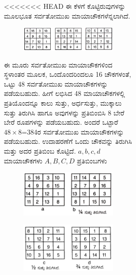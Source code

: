 \begin{figure}[H]
\begin{figure}[H]
\begin{figure}[H]
<<<<<<< HEAD
ಈ ಕೆಳಗೆ ಕೊಟ್ಟಿರುವುಗಳನ್ನು ಮೂಲಭೂತ ಸರ್ವತೋಮುಖ ಮಾಯಾಚೌಕಗಳೆನ್ನಲಾಗಿದೆ.
\begin{figure}[H]
\includegraphics{src/figures/chap4/fig4-10.jpg}
\end{figure}

ಈ ಮೂರು ಸರ್ವತೋಮುಖ ಮಾಯಾಚೌಕಗಳಿಂದ ಸ್ಥಳಾಂತರ ಮೂಲಕ, ಒಂದೊಂದರಿಂದಲೂ 16 ಚೌಕಗಳಂತೆ, ಒಟ್ಟು 48 ಸರ್ವತೋಮುಖ ಮಾಯಾಚೌಕಗಳನ್ನು ಪಡೆಯಬಹುದು. ಹೀಗೆ ಲಭಿಸಿದ 48 ಮಾಯಾಚೌಕಗಳಲ್ಲಿ ಪ್ರತಿಯೊಂದನ್ನೂ ಕಾಲು ಸುತ್ತು, ಅರ್ಧಸುತ್ತು, ಮುಕ್ಕಾಲು ಸುತ್ತು ತಿರುಗಿಸಿ ಹಾಗೂ ಅವುಗಳನ್ನು ಪ್ರತಿಬಿಂಬಿಸಿ 8 ಬೇರೆ ಬೇರೆ ರೂಪಗಳನ್ನು ಪಡೆಯಬಹುದು. ಅಂದರೆ ಒಟ್ಟಾರೆ $48 \times 8$=384ರ ಸರ್ವತೋಮುಖ ಮಾಯಾಚೌಕಗಳನ್ನು ಪಡೆಯಬಹುದು. ಉದಾಹರಣೆಗೆ ಒಂದು ಚೌಕವನ್ನು ತಿರುಗಿಸಿ ಮತ್ತು ಅದರ ಪ್ರತಿಬಿಂಬ ಕೊಟ್ಟಿದೆ. $a, b, c, d$ ಮಾಯಾಚೌಕಗಳು $A, B, C, D$ ಪ್ರತಿಬಿಂಬಗಳು
\begin{figure}[H]
\includegraphics{src/figures/chap4/fig4-11.jpg}
\end{figure}
\begin{figure}[H]
\includegraphics{src/figures/chap4/fig4-12.jpg}

\end{figure}
\end{figure}
\end{figure}
\end{figure}
